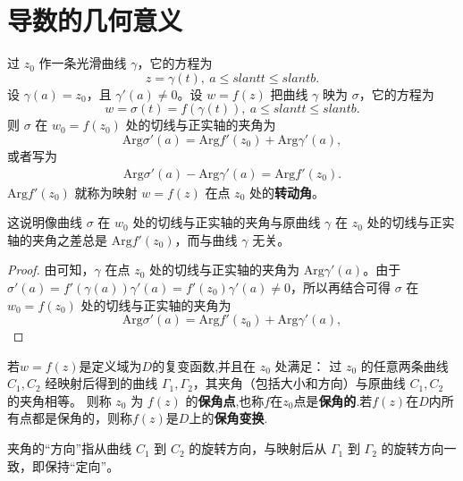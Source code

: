 \documentclass[../../main.tex]{subfiles}
\begin{document}
\section{导数的几何意义}

\begin{proposition}
过 \( z_0 \) 作一条光滑曲线 \( \gamma \)，它的方程为  
\[ z = \gamma(t),\ a \leqslant slant t \leqslant slant b. \]  
设 \( \gamma(a) = z_0 \)，且 \( \gamma'(a) \neq 0 \)。设 \( w = f(z) \) 把曲线 \( \gamma \) 映为 \( \sigma \)，它的方程为  
\[ w = \sigma(t) = f(\gamma(t)),\ a \leqslant slant t \leqslant slant b. \]  
则 \( \sigma \) 在 \( w_0 = f(z_0) \) 处的切线与正实轴的夹角为  
\[ \mathrm{Arg}\sigma'(a) = \mathrm{Arg} f'(z_0) + \mathrm{Arg} \gamma'(a), \]  
或者写为  
\begin{align}
\mathrm{Arg} \sigma'(a) - \mathrm{Arg} \gamma'(a) = \mathrm{Arg} f'(z_0). \label{equation----:::2.1}
\end{align}
\( \mathrm{Arg} f'(z_0) \) 就称为映射 \( w = f(z) \) 在点 \( z_0 \) 处的\textbf{转动角}。
\end{proposition}
\begin{note}
这说明像曲线 \( \sigma \) 在 \( w_0 \) 处的切线与正实轴的夹角与原曲线 \( \gamma \) 在 \( z_0 \) 处的切线与正实轴的夹角之差总是 \( \mathrm{Arg} f'(z_0) \)，而与曲线 \( \gamma \) 无关。
\end{note}
\begin{proof}
由可知，\( \gamma \) 在点 \( z_0 \) 处的切线与正实轴的夹角为 \( \mathrm{Arg} \gamma'(a) \)。由于 \( \sigma'(a) = f'(\gamma(a))\gamma'(a) = f'(z_0)\gamma'(a) \neq 0 \)，所以再结合可得 \( \sigma \) 在 \( w_0 = f(z_0) \) 处的切线与正实轴的夹角为  
\[ \mathrm{Arg}\sigma'(a) = \mathrm{Arg} f'(z_0) + \mathrm{Arg} \gamma'(a), \]  
\end{proof}

\begin{definition}
若\( w = f(z) \)是定义域为$D$的复变函数,并且在 \( z_0 \) 处满足：  
过 \( z_0 \) 的任意两条曲线 \( C_1, C_2 \) 经映射后得到的曲线 \( \Gamma_1, \Gamma_2 \)，其夹角（包括大小和方向）与原曲线 \( C_1, C_2 \) 的夹角相等。  
则称 \( z_0 \) 为 \( f(z) \) 的\textbf{保角点},也称$f$在$z_0$点是\textbf{保角的}.若\(f(z)\)在$D$内所有点都是保角的，则称\(f(z)\)是$D$上的\textbf{保角变换}.
\end{definition}
\begin{remark}
夹角的“方向”指从曲线 \( C_1 \) 到 \( C_2 \) 的旋转方向，与映射后从 \( \Gamma_1 \) 到 \( \Gamma_2 \) 的旋转方向一致，即保持“定向”。
\end{remark}
\end{document}
